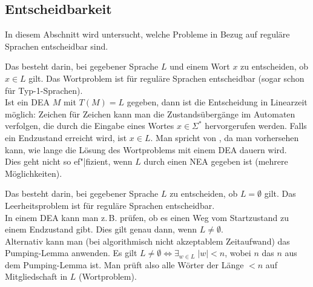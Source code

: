 \pagebreak

\subsection{%
    Entscheidbarkeit%
}

\begin{Bem}
    In diesem Abschnitt wird untersucht, welche Probleme in Bezug auf
    reguläre Sprachen entscheidbar sind.
\end{Bem}

\begin{Bem}
    Das  besteht darin, bei gegebener Sprache $L$
    und einem Wort $x$ zu entscheiden, ob $x \in L$ gilt.
    Das Wortproblem ist für reguläre Sprachen entscheidbar
    (sogar schon für Typ-1-Sprachen).\\
    Ist ein DEA $M$ mit $T(M) = L$ gegeben, dann ist die Entscheidung in
    Linearzeit möglich:
    Zeichen für Zeichen kann man die Zustandsübergänge im Automaten verfolgen,
    die durch die Eingabe eines Wortes $x \in \Sigma^\ast$ hervorgerufen
    werden.
    Falls ein Endzustand erreicht wird, ist $x \in L$.
    Man spricht von , da man vorhersehen kann, wie lange
    die Lösung des Wortproblems mit einem DEA dauern wird.\\
    Dies geht nicht so ef"|fizient, wenn $L$ durch einen NEA gegeben ist
    (mehrere Möglichkeiten).
\end{Bem}

\linie

\begin{Bem}
    Das  besteht darin, bei gegebener Sprache $L$
    zu entscheiden, ob $L = \emptyset$ gilt.
    Das Leerheitsproblem ist für reguläre Sprachen entscheidbar.\\
    In einem DEA kann man z.\,B. prüfen, ob es einen Weg vom Startzustand zu
    einem Endzustand gibt.
    Dies gilt genau dann, wenn $L \not= \emptyset$.\\
    Alternativ kann man (bei algorithmisch nicht akzeptablem Zeitaufwand)
    das Pumping-Lemma anwenden.
    Es gilt $L \not= \emptyset \iff \exists_{w \in L}\; |w| < n$, wobei
    $n$ das $n$ aus dem Pumping-Lemma ist.
    Man prüft also alle Wörter der Länge $< n$ auf Mitgliedschaft
    in $L$ (Wortproblem).
\end{Bem}

\linie

